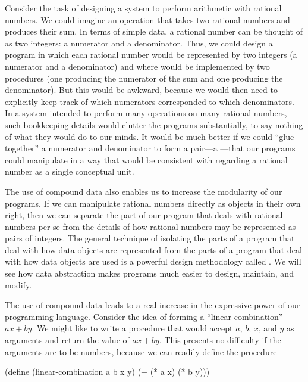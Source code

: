 Consider the task of designing a system to perform arithmetic with rational
numbers.  We could imagine an operation  that takes two rational
numbers and produces their sum.  In terms of simple data, a rational number can
be thought of as two integers: a numerator and a denominator.  Thus, we could
design a program in which each rational number would be represented by two
integers (a numerator and a denominator) and where  would be
implemented by two procedures (one producing the numerator of the sum and one
producing the denominator).  But this would be awkward, because we would then
need to explicitly keep track of which numerators corresponded to which
denominators.  In a system intended to perform many operations on many rational
numbers, such bookkeeping details would clutter the programs substantially, to
say nothing of what they would do to our minds.  It would be much better if we
could ``glue together'' a numerator and denominator to form a pair---a
---that our programs could manipulate in a way
that would be consistent with regarding a rational number as a single
conceptual unit.

The use of compound data also enables us to increase the modularity of our
programs.  If we can manipulate rational numbers directly as objects in their
own right, then we can separate the part of our program that deals with
rational numbers per se from the details of how rational numbers may be
represented as pairs of integers.  The general technique of isolating the parts
of a program that deal with how data objects are represented from the parts of
a program that deal with how data objects are used is a powerful design
methodology called .  We will see how data
abstraction makes programs much easier to design, maintain, and modify.

The use of compound data leads to a real increase in the expressive
power of our programming language.  Consider the idea of forming a
``linear combination'' \( ax + by \).  We might like to write
a procedure that would accept \( a \), \( b \), \( x \), and \( y \) as
arguments and return the value of \( ax + by \).  This
presents no difficulty if the arguments are to be numbers, because we
can readily define the procedure

\begin{codeBlock}
(define (linear-combination a b x y)
  (+ (* a x) (* b y)))
\end{codeBlock}


